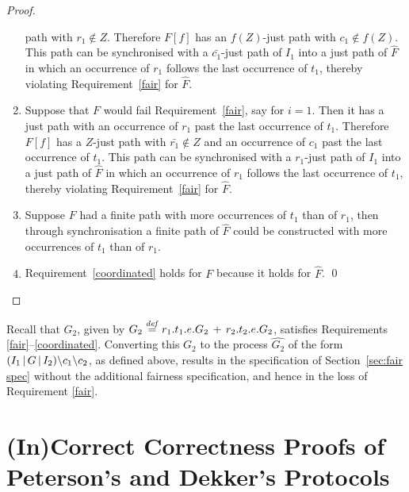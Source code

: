 \documentclass[smallcondensed]{svjour3}
\newcommand{\Sect}[1]{Section~\ref{sec:#1}}
\begin{document}
\begin{proof}
\begin{enumerate}
  path with $r_1\notin Z$. Therefore $F[f]$ has an $f(Z)$-just path with $c_1\notin f(Z)$.
  This path can be synchronised with a $\bar{c_1}$-just path of $I_1$ into a just path of $\widehat{F}$
  in which an occurrence of $r_1$ follows the last occurrence of $t_1$, thereby violating
  Requirement~\ref{fair} for $\widehat{F}$.
\item Suppose that $F$ would fail Requirement~\ref{fair}, say for $i=1$. Then it has a just
  path with an occurrence of $r_1$ past the last occurrence of $t_1$. Therefore $F[f]$ has a $Z$-just
  path with $\bar{r_1}\notin Z$ and an occurrence of $c_1$ past the last occurrence of $t_1$.
  This path can be synchronised with a $r_1$-just path of $I_1$ into a just path of $\widehat{F}$
  in which an occurrence of $r_1$ follows the last occurrence of $t_1$, thereby violating
  Requirement~\ref{fair} for $\widehat{F}$.
\item Suppose $F$ had a finite path with more occurrences of $t_1$ than of $r_1$, then through
  synchronisation a finite path of $\widehat{F}$ could be constructed with more occurrences of $t_1$ than of $r_1$.
\item Requirement~\ref{coordinated} holds for $F$ because it holds for $\widehat F$.
\qed
\end{enumerate}
\end{proof}
Recall that $G_2$, given by $G_2\stackrel{\it def}{=} r_1.t_{1}.e.G_2  \,+\, r_2.t_{2}.e.G_2$,
satisfies Requirements \mbox{\ref{fair}--\ref{coordinated}}. 
Converting this $G_2$ to the process $\widehat {G_2}$ of the form  $(I_1\,|\,G\,|\,I_2)\backslash
c_{1}\backslash c_{2}$, as defined above, results in the specification of \Sect{fair spec}
without the additional fairness specification, and hence in the loss of Requirement \ref{fair}.

\section{\hspace{-0.4pt}(\hspace{-0.1pt}In\hspace{-0.1pt})\hspace{-0.4pt}Correct\hspace{-0.4pt} Correctness\hspace{-0.4pt} Proofs\hspace{-0.4pt} of\hspace{-0.4pt} Peterson's\hspace{-0.4pt} and\hspace{-0.4pt} Dekker's\hspace{-0.4pt} Protocols}\label{sec:discussion}
\end{document}
